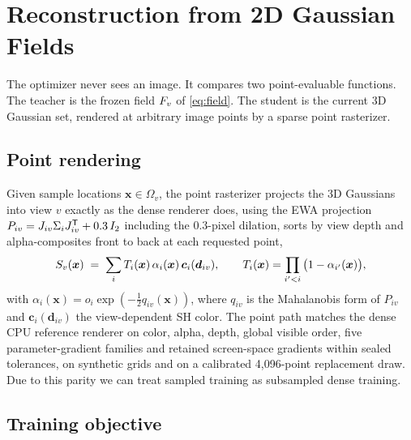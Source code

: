 \section{Reconstruction from 2D Gaussian Fields}
\label{sec:reconstruction}

The optimizer never sees an image.  It compares two point-evaluable functions.  The
teacher is the frozen field $F_v$ of \cref{eq:field}.  The student is the current 3D
Gaussian set, rendered at arbitrary image points by a sparse point rasterizer.

\subsection{Point rendering}
\label{sec:point-rasterizer}

Given sample locations $\bm{x} \in \Omega_v$, the point rasterizer projects the 3D
Gaussians into view $v$ exactly as the dense renderer does, using the EWA projection
$P_{iv} = J_{iv} \Sigma_i J_{iv}^{\mathsf{T}} + 0.3\,I_2$ including the $0.3$-pixel dilation, sorts
by view depth and alpha-composites front to back at each requested point,
\begin{equation}
  S_v(\bm{x}) \;=\; \sum_{i} T_i(\bm{x})\, \alpha_i(\bm{x})\, \bm{c}_i(\bm{d}_{iv}),
  \qquad
  T_i(\bm{x}) = \prod_{i' < i} \big(1 - \alpha_{i'}(\bm{x})\big),
  \label{eq:student}
\end{equation}
with $\alpha_i(\bm{x}) = o_i \exp(-\tfrac12 q_{iv}(\bm{x}))$, where $q_{iv}$ is the
Mahalanobis form of $P_{iv}$ and $\bm{c}_i(\bm{d}_{iv})$ the view-dependent SH color.  The
point path matches the dense CPU reference renderer on color, alpha, depth, global visible
order, five parameter-gradient families and retained screen-space gradients within sealed
tolerances, on synthetic grids and on a calibrated 4{,}096-point replacement draw.  Due to
this parity we can treat sampled training as subsampled dense
training.

\subsection{Training objective}
\label{sec:objective}


